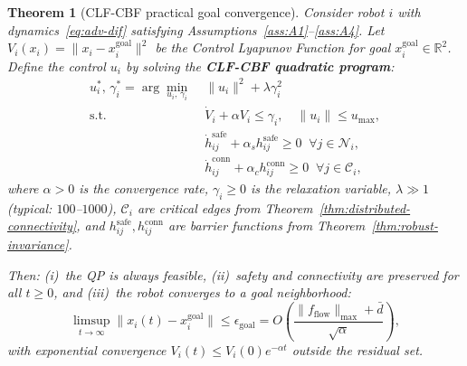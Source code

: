 \documentclass[conference]{IEEEconf}
\theoremstyle{plain}
\newtheorem{theorem}{Theorem} %
\begin{document}

\begin{theorem}[CLF-CBF practical goal convergence]
\label{thm:clf-goal-convergence}
Consider robot $i$ with dynamics~\eqref{eq:adv-dif} satisfying Assumptions~\ref{ass:A1}--\ref{ass:A4}. Let $V_i(x_i)=\|x_i-x_i^{\mathrm{goal}}\|^2$ be the Control Lyapunov Function for goal $x_i^{\mathrm{goal}}\in\mathbb{R}^2$. Define the control $u_i$ by solving the \textbf{CLF-CBF quadratic program}:
\begin{equation}
\begin{aligned}
u_i^*,\,\gamma_i^* = \arg\min_{u_i,\,\gamma_i} \; & \|u_i\|^2 + \lambda\gamma_i^2 \\
\text{s.t.} \; & \dot{V}_i + \alpha V_i \le \gamma_i, \quad \|u_i\| \le u_{\max}, \\
& \dot{h}_{ij}^{\mathrm{safe}} + \alpha_s h_{ij}^{\mathrm{safe}} \ge 0 \;\; \forall j\in\mathcal{N}_i, \\
& \dot{h}_{ij}^{\mathrm{conn}} + \alpha_c h_{ij}^{\mathrm{conn}} \ge 0 \;\; \forall j\in\mathcal{C}_i,
\end{aligned}
\label{eq:clf-cbf-qp}
\end{equation}
where $\alpha>0$ is the convergence rate, $\gamma_i\ge 0$ is the relaxation variable, $\lambda\gg 1$ (typical: $100$--$1000$), $\mathcal{C}_i$ are critical edges from Theorem~\ref{thm:distributed-connectivity}, and $h_{ij}^{\mathrm{safe}},h_{ij}^{\mathrm{conn}}$ are barrier functions from Theorem~\ref{thm:robust-invariance}.

Then: (i)~the QP is always feasible, (ii)~safety and connectivity are preserved for all $t\ge 0$, and (iii)~the robot converges to a goal neighborhood:
\begin{equation}
\limsup_{t\to\infty} \|x_i(t)-x_i^{\mathrm{goal}}\| \le \epsilon_{\mathrm{goal}} = O\left(\frac{\|f_{\mathrm{flow}}\|_{\max}+\bar{d}}{\sqrt{\alpha}}\right),
\label{eq:residual-set}
\end{equation}
with exponential convergence $V_i(t)\le V_i(0)e^{-\alpha t}$ outside the residual set.
\end{theorem}
\end{document}
